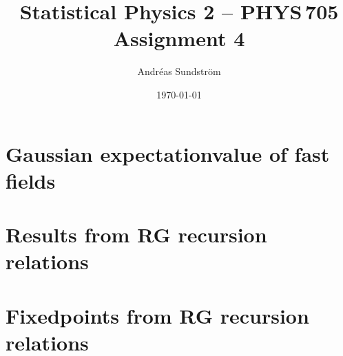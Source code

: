\documentclass[11pt,letter, swedish, english
]{article}
\begin{document}




\title{Statistical Physics 2 -- PHYS\,705 \\
Assignment 4}
\author{Andréas Sundström}
\date{\today}

\maketitle


\section{Gaussian expectationvalue of fast fields}





\section{Results from RG recursion relations}





\section{Fixedpoints from RG recursion relations}
\end{document}
